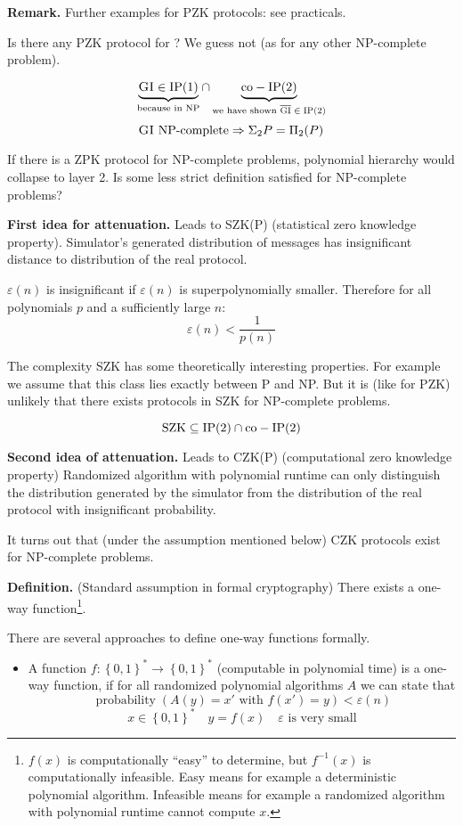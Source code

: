 \documentclass[a4paper]{article}
\newcommand{\cls}[1]{\rm{#1}}
\newcommand{\probl}[1]{\text{\textsc{#1}}}
\newcommand{\set}[1]{\left\{#1\right\}}
\DeclareMathOperator{\prop}{probability}
\begin{document}
\textbf{Remark.} Further examples for PZK protocols: see practicals.

Is there any PZK protocol for \probl{Hamiltonian Path}? We guess not (as for any other
\cls{NP}-complete problem).

\[
  \underbrace{\probl{GI} \in \cls{IP(1)}}_{\text{because in \cls{NP}}} \cap
  \underbrace{\cls{co-IP(2)}}_{\text{we have shown $\overline{\probl{GI}} \in \probl{IP(2)}$}}
\] \[
  \probl{GI} \text{ \cls{NP}-complete} \Rightarrow \Sigma_2 P = \Pi_2(P)
\]

If there is a ZPK protocol for \cls{NP}-complete problems, polynomial hierarchy would
collapse to layer 2. Is some less strict definition satisfied for \cls{NP}-complete
problems?

\textbf{First idea for attenuation.}
  Leads to \cls{SZK(P)} (statistical zero knowledge property).
  Simulator's generated distribution of messages has insignificant distance to
  distribution of the real protocol.

$\varepsilon(n)$ is insignificant if $\varepsilon(n)$ is superpolynomially
smaller. Therefore for all polynomials $p$ and a sufficiently large $n$:
\[
  \varepsilon(n) < \frac{1}{p(n)}
\]

The complexity SZK has some theoretically interesting properties. For example
we assume that this class lies exactly between P and \cls{NP}. But it is (like for
PZK) unlikely that there exists protocols in SZK for \cls{NP}-complete problems.

\[
  \cls{SZK} \subseteq \cls{IP(2)} \cap \cls{co-IP(2)}
\]

\textbf{Second idea of attenuation.}
  Leads to \cls{CZK(P)} (computational zero knowledge property)
  Randomized algorithm with polynomial runtime can only distinguish the
  distribution generated by the simulator from the distribution of the
  real protocol with insignificant probability.

  It turns out that (under the assumption mentioned below) \cls{CZK}
  protocols exist for \cls{NP}-complete problems.

\textbf{Definition.} (Standard assumption in formal cryptography)
  There exists a one-way function\footnote{$f(x)$ is computationally
  ``easy'' to determine, but $f^{-1}(x)$ is computationally infeasible.
  Easy means for example a deterministic polynomial algorithm.
  Infeasible means for example a randomized algorithm with polynomial
  runtime cannot compute $x$.}.

There are several approaches to define one-way functions formally.
\begin{itemize}
  \item
    A function $f: \set{0,1}^* \rightarrow \set{0,1}^*$ (computable
    in polynomial time) is a one-way function, if for all randomized
    polynomial algorithms $A$ we can state that
    \[
      \prop(A(y) = x' \text{ with } f(x') = y)
      < \varepsilon(n)
    \] \[
      x \in \set{0,1}^* \quad
      y = f(x) \quad
      \varepsilon \text{ is very small}
    \]
\end{itemize}
\end{document}
